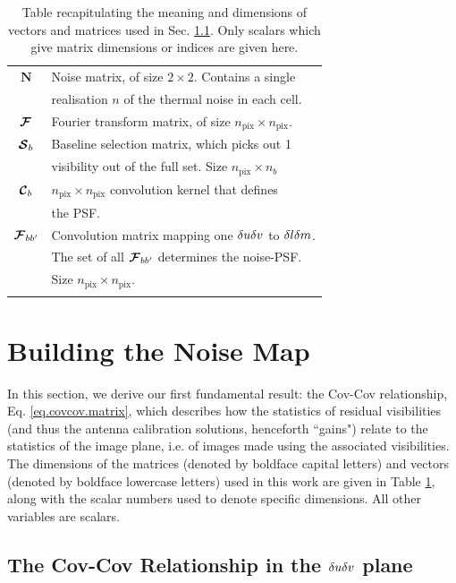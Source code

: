 \begin{table}[t!]
\begin{tabular}{c l}
$\bm{N}$       & Noise matrix, of size $2\times 2$. Contains a single \\
& realisation $n$ of the thermal noise in each cell.\\
$\bm{\mathcal{F}}$       & Fourier transform matrix, of size $n_{\mathrm{pix}}\times n_{\mathrm{pix}}$.\\
$\bm{\mathcal{S}}_b$     & Baseline selection matrix, which picks out 1\\
&  visibility out of the full set. Size $n_{\mathrm{pix}} \times n_b$\\
$\bm{\mathcal{C}}_b$     & $n_{\mathrm{pix}} \times n_{\mathrm{pix}}$ convolution kernel that defines\\
               &  the PSF.\\
$\bm{\mathcal{F}}_{bb'}$ & Convolution matrix mapping one $\delta u\delta v$ to $\delta l\delta m$.\\
& The set of all $\bm{\mathcal{F}}_{bb'}$ determines the noise-PSF.\\
               & Size $n_{\mathrm{pix}} \times n_{\mathrm{pix}}$.\\
&\\
\hline
\end{tabular}
\caption{Table recapitulating the meaning and dimensions of vectors and matrices used {in Sec. \ref{sec.dudv}}. Only scalars which give matrix dimensions or indices are given here.}
\label{tab.variables}
\end{table}

\section{Building the Noise Map}\label{sec.formalism}

\pg
In this section, we derive our first fundamental result: the Cov-Cov relationship, Eq. \ref{eq.covcov.matrix}, which describes how the statistics of residual visibilities (and thus the antenna calibration solutions, henceforth ``gains") relate to the statistics of the image plane, i.e. of images made using the associated visibilities. The dimensions of the matrices (denoted by boldface capital letters) and vectors (denoted by boldface lowercase letters) used in this work are given in Table \ref{tab.variables}, along with the scalar numbers used to denote specific dimensions. All other variables are scalars.


\subsection{The Cov-Cov Relationship in the $\delta u\delta v$ plane}\label{sec.dudv}

